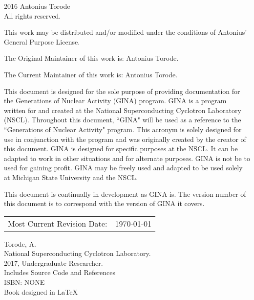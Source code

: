 \pagestyle{empty}
\begingroup
\footnotesize
\parindent 0pt
\parskip \baselineskip
\textcopyright{} 2016 Antonius Torode \\
All rights reserved.

This work may be distributed and/or modified under the conditions of Antonius' General Purpose License.

The Original Maintainer of this work is: Antonius Torode.

The Current Maintainer of this work is: Antonius Torode.

This document is designed for the sole purpose of providing documentation for the Generations of Nuclear Activity (GINA) program. GINA is a program written for and created at the National Superconducting Cyclotron Laboratory (NSCL). Throughout this document, ``GINA" will be used as a reference to the ``Generations of Nuclear Activity" program. This acronym is solely designed for use in conjunction with the program and was originally created by the creator of this document. GINA is designed for specific purposes at the NSCL. It can be adapted to work in other situations and for alternate purposes. GINA is not be to used for gaining profit. GINA may be freely used and adapted to be used solely at Michigan State University and the NSCL.

This document is continually in development as GINA is. The version number of this document is to correspond with the version of GINA it covers.


\begin{center}
\begin{tabular}{ll}
Most Current Revision Date: &  \today 
\end{tabular}
\end{center}

\vfill

Torode, A.\\
\hspace*{2em} National Superconducting Cyclotron Laboratory. \\
\hspace*{2em} 2017, Undergraduate Researcher. \\
\hspace*{2em} Includes Source Code and References \\
\hspace*{2em} ISBN: NONE \\
\hspace*{2em} Book designed in \LaTeX



\endgroup
\clearpage